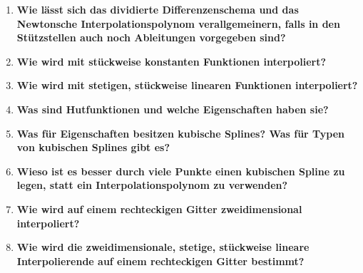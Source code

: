 \documentclass[10pt,a4paper]{article}
\begin{document}
\begin{enumerate}
		\item \textbf{Wie lässt sich das dividierte Differenzenschema und das Newtonsche Interpolationspolynom verallgemeinern, falls in den Stützstellen auch noch Ableitungen vorgegeben sind?} \\
		
		\item \textbf{Wie wird mit stückweise konstanten Funktionen interpoliert?} \\
		
		\item \textbf{Wie wird mit stetigen, stückweise linearen Funktionen interpoliert?} \\
		
		\item \textbf{Was sind Hutfunktionen und welche Eigenschaften haben sie?} \\
		
		\item \textbf{Was für Eigenschaften besitzen kubische Splines? Was für Typen von kubischen Splines gibt es?} \\
		
		\item \textbf{Wieso ist es besser durch viele Punkte einen kubischen Spline zu legen, statt ein Interpolationspolynom zu verwenden?} \\
		
		\item \textbf{Wie wird auf einem rechteckigen Gitter zweidimensional interpoliert?} \\
		
		\item \textbf{Wie wird die zweidimensionale, stetige, stückweise lineare Interpolierende auf einem rechteckigen Gitter bestimmt?} \\
		
	\end{enumerate}

	\newpage
\end{document}
